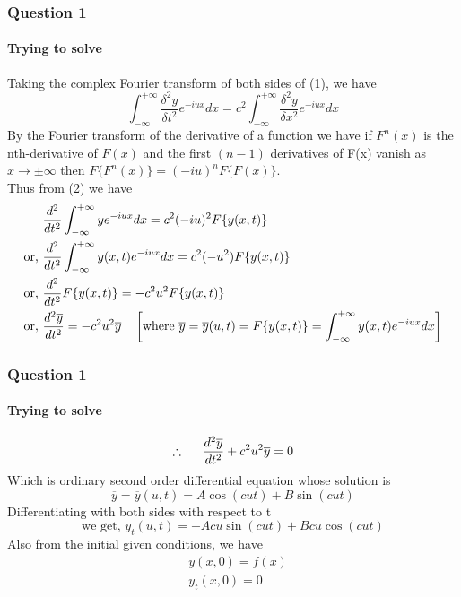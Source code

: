 \documentclass[9 pt]{beamer}
\begin{document}
\begin{frame}
	\frametitle{Question 1}
	\framesubtitle{Trying to solve}
	Taking the complex Fourier transform of both sides of (1), we have
	\begin{equation}
		\int_{-\infty}^{+\infty}\frac{\delta^2y}{\delta t^2}e^{-iux} dx=c^2\int_{-\infty}^{+\infty}\frac{\delta^2y}{\delta x^2}e^{-iux} dx
	\end{equation}
	By the Fourier transform of the derivative of a function we have if $F^n(x)$ is the nth-derivative of $F(x)$ and the first $(n-1)$ derivatives of F(x) vanish as $x \rightarrow \pm \infty$ then $F\{F^n(x)\}=(-iu)^n F\{F(x)\}$. \\
	Thus from (2) we have
	\begin{align*}
		              & \frac{d^2}{dt^2}\int_{-\infty}^{+\infty}ye^{-iux} dx =c^2(-iu)^2F\{y(x,t)\}                                                                                                       \\
		\textrm{or, } & \frac{d^2}{dt^2}\int_{-\infty}^{+\infty}y(x,t)e^{-iux} dx =c^2(-u^2) F\{y(x,t)\}                                                                                                  \\
		\textrm{or, } & \frac{d^2}{dt^2}F\{y(x,t)\} =-c^2u^2 F\{y(x,t)\}                                                                                                                                  \\
		\textrm{or, } & \frac{d^2\overline{y}}{dt^2} =-c^2u^2\overline{y} \hspace{0.35cm}\left[\textrm{where }\overline{y}=\overline{y}(u,t)=F\{y(x,t)\}=\int_{-\infty}^{+\infty}y(x,t)e^{-iux} dx\right]
	\end{align*}
	\transwipe[duration=0.6]
\end{frame}


\begin{frame}[fragile]
	\frametitle{Question 1}
	\framesubtitle{Trying to solve}
	\begin{equation}
		\therefore\hspace{0.5cm}\frac{d^2\overline{y}}{dt^2}+c^2u^2\overline{y}=0
	\end{equation}
	Which is ordinary second order differential equation whose solution is
	\begin{equation}
		\overline{y}=\overline{y}(u,t)=A\cos (cut) + B\sin (cut)
	\end{equation}
	Differentiating with both sides with respect to t
	\begin{equation}
		\textrm{we get, } \overline{y}_t(u,t) = -Acu\sin (cut) + Bcu \cos (cut)
	\end{equation}
	Also from the initial given conditions, we have
	\begin{align}
		 & y(x,0)=f(x) \\
		 & y_t(x,0)=0
	\end{align}
	\transfade[duration=0.6]
\end{frame}
\end{document}
